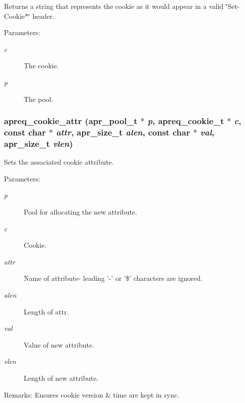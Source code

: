 Returns a string that represents the cookie as it would appear in a valid \char`\"{}Set-Cookie$\ast$\char`\"{} header.

\begin{Desc}
\item[Parameters:]
\begin{description}
\item[{\em c}]The cookie. \item[{\em p}]The pool. \end{description}
\end{Desc}
\subsubsection{ apreq\_\-cookie\_\-attr ({\bf apr\_\-pool\_\-t} $\ast$ {\em p}, {\bf apreq\_\-cookie\_\-t} $\ast$ {\em c}, const char $\ast$ {\em attr}, {\bf apr\_\-size\_\-t} {\em alen}, const char $\ast$ {\em val}, {\bf apr\_\-size\_\-t} {\em vlen})}\label{group__cookies_a6}


Sets the associated cookie attribute. \begin{Desc}
\item[Parameters:]
\begin{description}
\item[{\em p}]Pool for allocating the new attribute. \item[{\em c}]Cookie. \item[{\em attr}]Name of attribute- leading '-' or '\$' characters are ignored. \item[{\em alen}]Length of attr. \item[{\em val}]Value of new attribute. \item[{\em vlen}]Length of new attribute. \end{description}
\end{Desc}
\begin{Desc}
\item[Remarks:]Ensures cookie version \& time are kept in sync. \end{Desc}
